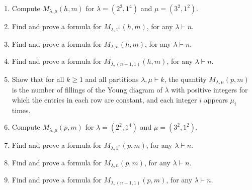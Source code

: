 \documentclass{article}
\begin{document}
\begin{enumerate}
\item Compute $M_{\lambda,\mu}(h,m)$ for $\lambda=(2^2,1^4)$ and $\mu=(3^2,1^2)$.

\item Find and prove a formula for $M_{\lambda, 1^n}(h,m)$, for any $\lambda \vdash n$. 

\item Find and prove a formula for $M_{\lambda, n}(h,m)$, for any $\lambda \vdash n$. 

\item Find and prove a formula for $M_{\lambda, (n-1,1)}(h,m)$, for any $\lambda \vdash n$.

\item Show that for all $k\geq 1$ and all partitions $\lambda, \mu\vdash k$, the quantity $M_{\lambda, \mu}(p,m)$ is the number of fillings of the Young diagram of $\lambda$ with positive integers for which the entries in each row are constant, and each integer $i$ appears $\mu_i$ times. 

\item Compute $M_{\lambda,\mu}(p,m)$ for $\lambda=(2^2,1^4)$ and $\mu=(3^2,1^2)$.

\item Find and prove a formula for $M_{\lambda, 1^n}(p,m)$, for any $\lambda \vdash n$. 

\item Find and prove a formula for $M_{\lambda, n}(p,m)$, for any $\lambda \vdash n$. 

\item Find and prove a formula for $M_{\lambda, (n-1,1)}(p,m)$, for any $\lambda \vdash n$.



\end{enumerate}
\end{document}
